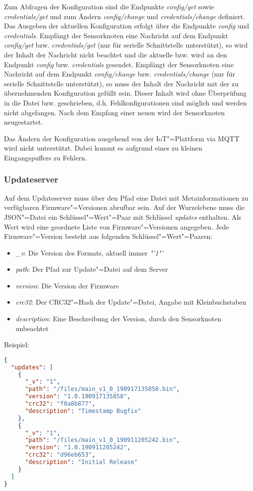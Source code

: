 Zum Abfragen der Konfiguration sind die Endpunkte \textit{config/get} sowie \textit{credentials/get} und zum Ändern \textit{config/change} und \textit{credentials/change} definiert.
Das Ausgeben der aktuellen Konfiguration erfolgt über die Endpunkte \textit{config} und \textit{credentials}.
Empfängt der Sensorknoten eine Nachricht auf dem Endpunkt \textit{config/get} bzw. \textit{credentials/get} (nur für serielle Schnittstelle unterstützt), so wird der Inhalt der Nachricht nicht beachtet und die aktuelle  bzw.  wird an den Endpunkt \textit{config} bzw. \textit{credentials} gesendet.
Empfängt der Sensorknoten eine Nachricht auf dem Endpunkt \textit{config/change} bzw. \textit{credentials/change} (nur für serielle Schnittstelle unterstützt), so muss der Inhalt der Nachricht mit der zu übernehmenden Konfiguration gefüllt sein.
Dieser Inhalt wird ohne Überprüfung in die Datei  bzw.  geschrieben, d.h. Fehlkonfigurationen sind möglich und werden nicht abgefangen.
Nach dem Empfang einer neuen  wird der Sensorknoten neugestartet.

Das Ändern der Konfiguration ausgehend von der IoT"=Plattform via MQTT wird nicht unterstützt.
Dabei kommt es aufgrund eines zu kleinen Eingangspuffers zu Fehlern.

\subsubsection{Updateserver}
Auf dem Updateserver muss über den Pfad  eine Datei mit Metainformationen zu verfügbaren Firmware"=Versionen abrufbar sein.
Auf der Wurzelebene muss die JSON"=Datei ein Schlüssel"=Wert"=Paar mit Schlüssel \textit{updates} enthalten.
Als Wert wird eine geordnete Liste von Firmware"=Versionen angegeben.
Jede Firmware"=Version besteht aus folgenden Schlüssel"=Wert"=Paaren:
\begin{itemize}
    \item \textit{\_v}: Die Version des Formats, aktuell immer \textit{"'1"'}
    \item \textit{path}: Der Pfad zur Update"=Datei auf dem Server
    \item \textit{version}: Die Version der Firmware
    \item \textit{crc32}: Der CRC32"=Hash der Update"=Datei, Angabe mit Kleinbuchstaben
    \item \textit{description}: Eine Beschreibung der Version, durch den Sensorknoten unbeachtet
\end{itemize}

Beispiel:

\begin{lstlisting}[language=json,basicstyle=\footnotesize]
{
  "updates": [
    {
      "_v": "1",
      "path": "/files/main_v1_0_190917135858.bin",
      "version": "1.0.190917135858",
      "crc32": "f8a8b877",
      "description": "Timestamp Bugfix"
    },
    {
      "_v": "1",
      "path": "/files/main_v1_0_190911205242.bin",
      "version": "1.0.190911205242",
      "crc32": "d96eb653",
      "description": "Initial Release"
    }
  ]
}
\end{lstlisting}
